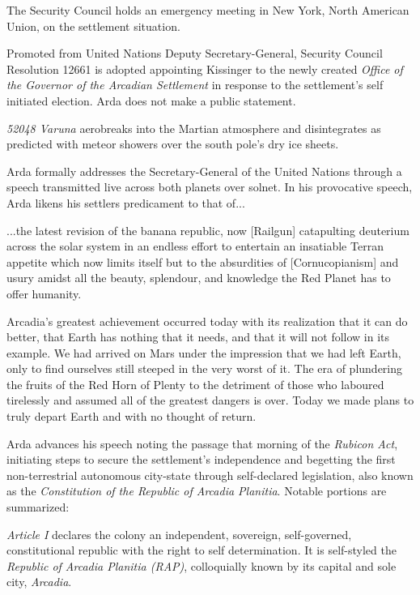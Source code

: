 The Security Council holds an emergency meeting in New York, North American Union, on the settlement situation.
\StopTimelineDate

Promoted from United Nations Deputy Secretary-General, Security Council Resolution 12661 is adopted appointing Kissinger to the newly created {\it Office of the Governor of the Arcadian Settlement} in response to the settlement's self initiated election. Arda does not make a public statement.
\StopTimelineDate

{\it 52048 Varuna} aerobreaks into the Martian atmosphere and disintegrates as predicted with meteor showers over the south pole's dry ice sheets.
\StopTimelineDate

Arda formally addresses the Secretary-General of the United Nations through a speech transmitted live across both planets over solnet. In his provocative speech, Arda likens his settlers predicament to that of...

\startTimelineDocument
...the latest revision of the banana republic, now [Railgun] catapulting deuterium across the solar system in an endless effort to entertain an insatiable Terran appetite which now limits itself but to the absurdities of [Cornucopianism] and usury amidst all the beauty, splendour, and knowledge the Red Planet has to offer humanity.

Arcadia's greatest achievement occurred today with its realization that it can do better, that Earth has nothing that it needs, and that it will not follow in its example. We had arrived on Mars under the impression that we had left Earth, only to find ourselves still steeped in the very worst of it. The era of plundering the fruits of the Red Horn of Plenty to the detriment of those who laboured tirelessly and assumed all of the greatest dangers is over. Today we made plans to truly depart Earth and with no thought of return.
\stopTimelineDocument

Arda advances his speech noting the passage that morning of the {\it Rubicon Act}, initiating steps to secure the settlement's independence and begetting the first non-terrestrial autonomous city-state through self-declared legislation, also known as the {\it Constitution of the Republic of Arcadia Planitia}. Notable portions are summarized:

\startTimelineDocument
\startitemize[5]
\setupwhitespace[big]
\item {\it Article I} declares the colony an independent, sovereign, self-governed, constitutional republic with the right to self determination. It is self-styled the {\it Republic of Arcadia Planitia (RAP)}, colloquially known by its capital and sole city, {\it Arcadia}.

